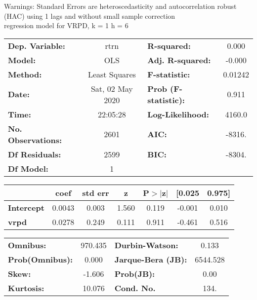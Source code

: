 Warnings: \newline
 [1] Standard Errors are heteroscedasticity and autocorrelation robust (HAC) using 1 lags and without small sample correction\\ 

regression model for VRPD, k = 1 h = 6\begin{center}
\begin{tabular}{lclc}
\toprule
\textbf{Dep. Variable:}    &       rtrn       & \textbf{  R-squared:         } &     0.000   \\
\textbf{Model:}            &       OLS        & \textbf{  Adj. R-squared:    } &    -0.000   \\
\textbf{Method:}           &  Least Squares   & \textbf{  F-statistic:       } &   0.01242   \\
\textbf{Date:}             & Sat, 02 May 2020 & \textbf{  Prob (F-statistic):} &    0.911    \\
\textbf{Time:}             &     22:05:28     & \textbf{  Log-Likelihood:    } &    4160.0   \\
\textbf{No. Observations:} &        2601      & \textbf{  AIC:               } &    -8316.   \\
\textbf{Df Residuals:}     &        2599      & \textbf{  BIC:               } &    -8304.   \\
\textbf{Df Model:}         &           1      & \textbf{                     } &             \\
\bottomrule
\end{tabular}
\begin{tabular}{lcccccc}
                   & \textbf{coef} & \textbf{std err} & \textbf{z} & \textbf{P$> |$z$|$} & \textbf{[0.025} & \textbf{0.975]}  \\
\midrule
\textbf{Intercept} &       0.0043  &        0.003     &     1.560  &         0.119        &       -0.001    &        0.010     \\
\textbf{vrpd}      &       0.0278  &        0.249     &     0.111  &         0.911        &       -0.461    &        0.516     \\
\bottomrule
\end{tabular}
\begin{tabular}{lclc}
\textbf{Omnibus:}       & 970.435 & \textbf{  Durbin-Watson:     } &    0.133  \\
\textbf{Prob(Omnibus):} &   0.000 & \textbf{  Jarque-Bera (JB):  } & 6544.528  \\
\textbf{Skew:}          &  -1.606 & \textbf{  Prob(JB):          } &     0.00  \\
\textbf{Kurtosis:}      &  10.076 & \textbf{  Cond. No.          } &     134.  \\
\bottomrule
\end{tabular}
\end{center}

